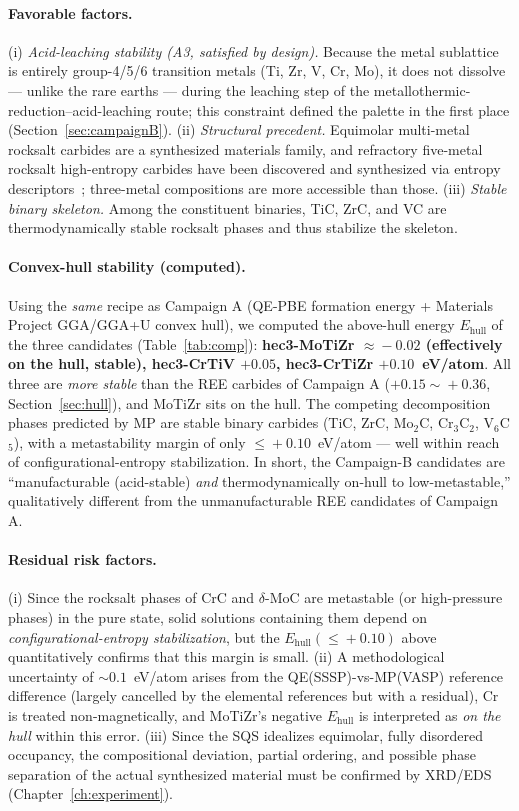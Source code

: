 \documentclass[11pt,a4paper]{report}
\begin{document}
\paragraph{Favorable factors.} (i) \emph{Acid-leaching stability (A3, satisfied by design).} Because the metal
sublattice is entirely group-4/5/6 transition metals (Ti, Zr, V, Cr, Mo), it does not dissolve --- unlike the
rare earths --- during the leaching step of the metallothermic-reduction--acid-leaching route; this constraint
defined the palette in the first place (Section~\ref{sec:campaignB}). (ii) \emph{Structural precedent.}
Equimolar multi-metal rocksalt carbides are a synthesized materials family, and refractory five-metal rocksalt
high-entropy carbides have been discovered and synthesized via entropy descriptors~\cite{sarker2018}; three-metal
compositions are more accessible than those. (iii) \emph{Stable binary skeleton.} Among the constituent binaries,
TiC, ZrC, and VC are thermodynamically stable rocksalt phases and thus stabilize the skeleton.

\paragraph{Convex-hull stability (computed).} Using the \emph{same} recipe as Campaign A (QE-PBE formation energy
+ Materials Project GGA/GGA+U convex hull), we computed the above-hull energy $E_{\mathrm{hull}}$ of the three
candidates (Table~\ref{tab:comp}): \textbf{hec3-MoTiZr $\approx\!-0.02$ (effectively on the hull, stable),
hec3-CrTiV $+0.05$, hec3-CrTiZr $+0.10$~eV/atom}. All three are \emph{more stable} than the REE carbides of
Campaign A ($+0.15\!\sim\!+0.36$, Section~\ref{sec:hull}), and MoTiZr sits on the hull. The competing decomposition
phases predicted by MP are stable binary carbides (TiC, ZrC, Mo$_2$C, Cr$_3$C$_2$, V$_6$C$_5$), with a metastability
margin of only $\le\!+0.10$~eV/atom --- well within reach of configurational-entropy stabilization. In short, the
Campaign-B candidates are ``manufacturable (acid-stable) \emph{and} thermodynamically on-hull to low-metastable,''
qualitatively different from the unmanufacturable REE candidates of Campaign A.

\paragraph{Residual risk factors.} (i) Since the rocksalt phases of CrC and $\delta$-MoC are metastable (or
high-pressure phases) in the pure state, solid solutions containing them depend on \emph{configurational-entropy
stabilization}, but the $E_{\mathrm{hull}}(\le\!+0.10)$ above quantitatively confirms that this margin is small.
(ii) A methodological uncertainty of $\sim\!0.1$~eV/atom arises from the QE(SSSP)-vs-MP(VASP) reference difference
(largely cancelled by the elemental references but with a residual), Cr is treated non-magnetically, and MoTiZr's
negative $E_{\mathrm{hull}}$ is interpreted as \emph{on the hull} within this error. (iii) Since the SQS idealizes
equimolar, fully disordered occupancy, the compositional deviation, partial ordering, and possible phase separation
of the actual synthesized material must be confirmed by XRD/EDS (Chapter~\ref{ch:experiment}).
\end{document}
